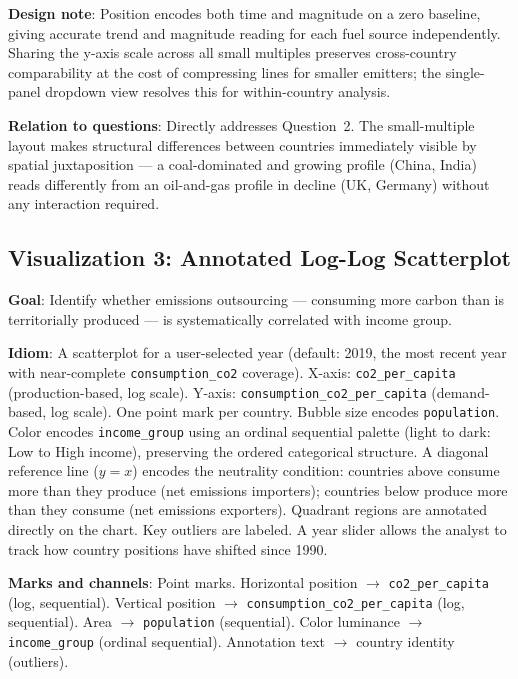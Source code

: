 \documentclass[10pt]{article}
\begin{document}
\textbf{Design note}: Position encodes both time and magnitude on a zero baseline, giving accurate trend and magnitude reading for each fuel source independently. Sharing the y-axis scale across all small multiples preserves cross-country comparability at the cost of compressing lines for smaller emitters; the single-panel dropdown view resolves this for within-country analysis.

\textbf{Relation to questions}: Directly addresses Question~2. The small-multiple layout makes structural differences between countries immediately visible by spatial juxtaposition --- a coal-dominated and growing profile (China, India) reads differently from an oil-and-gas profile in decline (UK, Germany) without any interaction required.

\subsection{Visualization 3: Annotated Log-Log Scatterplot}

\textbf{Goal}: Identify whether emissions outsourcing --- consuming more carbon than is territorially produced --- is systematically correlated with income group.

\textbf{Idiom}: A scatterplot for a user-selected year (default: 2019, the most recent year with near-complete \texttt{consumption\_co2} coverage). X-axis: \texttt{co2\_per\_capita} (production-based, log scale). Y-axis: \texttt{consumption\_co2\_per\_capita} (demand-based, log scale). One point mark per country. Bubble size encodes \texttt{population}. Color encodes \texttt{income\_group} using an ordinal sequential palette (light to dark: Low to High income), preserving the ordered categorical structure. A diagonal reference line ($y = x$) encodes the neutrality condition: countries above consume more than they produce (net emissions importers); countries below produce more than they consume (net emissions exporters). Quadrant regions are annotated directly on the chart. Key outliers are labeled. A year slider allows the analyst to track how country positions have shifted since 1990.

\textbf{Marks and channels}: Point marks. Horizontal position $\rightarrow$ \texttt{co2\_per\_capita} (log, sequential). Vertical position $\rightarrow$ \texttt{consumption\_co2\_per\_capita} (log, sequential). Area $\rightarrow$ \texttt{population} (sequential). Color luminance $\rightarrow$ \texttt{income\_group} (ordinal sequential). Annotation text $\rightarrow$ country identity (outliers).
\end{document}
